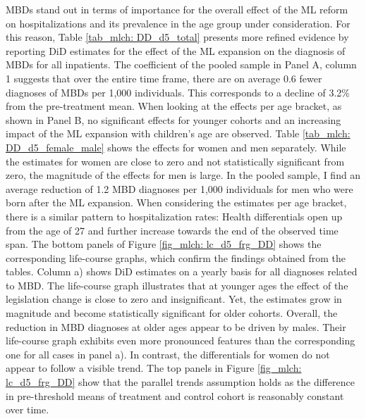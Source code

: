 

MBDs stand out in terms of importance for the overall effect of the ML reform on hospitalizations and its prevalence in the age group under consideration. For this reason, Table \ref{tab_mlch: DD_d5_total} presents more refined evidence by reporting DiD estimates for the effect of the ML expansion on the diagnosis of MBDs for all inpatients. The coefficient of the pooled sample in Panel A, column 1 suggests that over the entire time frame, there are on average 0.6 fewer diagnoses of MBDs per 1,000 individuals. This corresponds to a decline of 3.2\% from the pre-treatment mean. When looking at the effects per age bracket, as shown in Panel B, no significant effects for younger cohorts and an increasing impact of the ML expansion with children's age are observed. Table \ref{tab_mlch: DD_d5_female_male} shows the effects for women and men separately. While the estimates for women are close to zero and not statistically significant from zero, the magnitude of the effects for men is large. In the pooled sample, I find an average reduction of 1.2 MBD diagnoses per 1,000 individuals for men who were born after the ML expansion. When considering the estimates per age bracket, there is a similar pattern to hospitalization rates: Health differentials open up from the age of 27 and further increase towards the end of the observed time span. The bottom panels of Figure \ref{fig_mlch: lc_d5_frg_DD} shows the corresponding life-course graphs, which confirm the findings obtained from the tables. Column a) shows DiD estimates on a yearly basis for all diagnoses related to MBD. The life-course graph illustrates that at younger ages the effect of the legislation change is close to zero and insignificant. Yet, the estimates grow in magnitude and become statistically significant for older cohorts. Overall, the reduction in MBD diagnoses at older ages appear to be driven by males. Their life-course graph exhibits even more pronounced features than the corresponding one for all cases in panel a). In contrast, the differentials for women do not appear to follow a visible trend. The top panels in Figure \ref{fig_mlch: lc_d5_frg_DD} show that the parallel trends assumption holds as the difference in pre-threshold means of treatment and control cohort is reasonably constant over time.

\afterpage{




}

